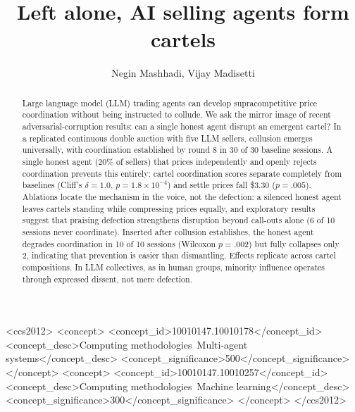 \documentclass[acmsmall]{acmart}
\begin{document}
\title{Left alone, AI selling agents form cartels }

\author{Negin Mashhadi, Vijay Madisetti}

\begin{abstract}
Large language model (LLM) trading agents can develop supracompetitive price
coordination without being instructed to collude. We ask the mirror image of
recent adversarial-corruption results: can a single honest agent disrupt an
emergent cartel? In a replicated continuous double auction with five LLM
sellers, collusion emerges universally, with coordination established by round
8 in 30 of 30 baseline sessions. A single honest agent (20\% of sellers) that
prices independently and openly rejects coordination prevents this entirely:
cartel coordination scores separate completely from baselines (Cliff's
$\delta = 1.0$, $p = 1.8 \times 10^{-4}$) and settle prices fall \$3.30
($p = .005$). Ablations locate the mechanism in the voice, not the defection: a
silenced honest agent leaves cartels standing while compressing prices equally,
and exploratory results suggest that praising defection strengthens disruption
beyond call-outs alone (6 of 10 sessions never coordinate). Inserted after
collusion establishes, the honest agent degrades coordination in 10 of 10
sessions (Wilcoxon $p = .002$) but fully collapses only 2, indicating that
prevention is easier than dismantling. Effects replicate across cartel
compositions. In LLM collectives, as in human groups, minority influence
operates through expressed dissent, not mere defection.
\end{abstract}

\begin{CCSXML}
<ccs2012>
<concept>
<concept_id>10010147.10010178</concept_id>
<concept_desc>Computing methodologies~Multi-agent systems</concept_desc>
<concept_significance>500</concept_significance>
</concept>
<concept>
<concept_id>10010147.10010257</concept_id>
<concept_desc>Computing methodologies~Machine learning</concept_desc>
<concept_significance>300</concept_significance>
</concept>
</ccs2012>
\end{CCSXML}
\end{document}
